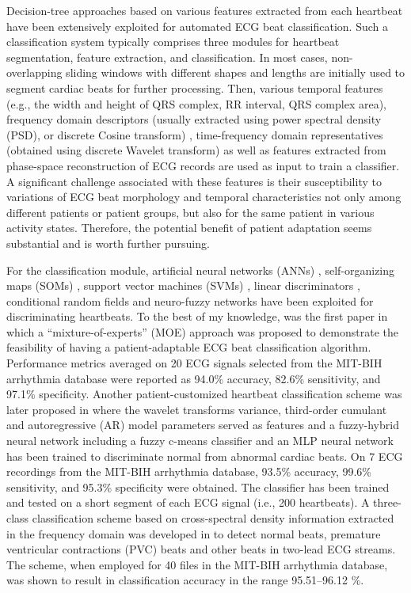 \documentclass[review]{elsarticle}
\begin{document}
Decision-tree approaches based on various features extracted from each heartbeat have been extensively exploited for automated ECG beat classification. Such a classification system typically comprises three modules for heartbeat segmentation, feature extraction, and classification. In most cases, non-overlapping sliding windows with different shapes and lengths are initially used to segment cardiac beats for further processing. Then, various temporal features (e.g., the width and height of QRS complex, RR interval, QRS complex area)\cite{de2004automatic,christov2006comparative}, frequency domain descriptors (usually extracted using power spectral density (PSD), or discrete Cosine transform) \cite{dutta2010correlation,chen2017heartbeat}, time-frequency domain representatives (obtained using discrete Wavelet transform) \cite{christov2006comparative,faezipour2010patient} as well as features extracted from phase-space reconstruction of ECG records \cite{ubeyli2010recurrent,nejadgholi2011using} are used as input to train a classifier. A significant challenge associated with these features is their susceptibility to variations of ECG beat morphology and temporal characteristics not only among different patients or patient groups, but also for the same patient in various activity states. Therefore, the potential benefit of patient adaptation seems substantial and is worth further pursuing.

For the classification module, artificial neural networks (ANNs) \cite{ince2009generic,li2017high}, self-organizing maps (SOMs) \cite{hu1997patient}, support vector machines (SVMs) \cite{dutta2010correlation,chen2017heartbeat}, linear discriminators \cite{de2004automatic,de2006patient}, conditional random fields \cite{de2012weighted} and neuro-fuzzy networks \cite{engin2004ecg} have been exploited for discriminating heartbeats. 
To the best of my knowledge, \cite{hu1997patient} was the first paper in which a ``mixture-of-experts'' (MOE) approach was proposed to demonstrate the feasibility of having a patient-adaptable ECG beat classification
algorithm. Performance metrics averaged on 20 ECG signals selected from the MIT-BIH arrhythmia database were reported as 94.0\% accuracy, 82.6\% sensitivity, and 97.1\% specificity. Another patient-customized heartbeat classification scheme was later proposed in \cite{engin2004ecg} where the wavelet transforms variance, third-order cumulant and autoregressive (AR) model parameters served as features and a fuzzy-hybrid neural network including a fuzzy c-means
classifier and an MLP neural network has been trained to discriminate normal from abnormal cardiac beats. On 7 ECG recordings from the MIT-BIH arrhythmia database, 93.5\% accuracy, 99.6\% sensitivity, and 95.3\% specificity were obtained. The classifier has been trained and tested on a short segment of each ECG signal (i.e., 200 heartbeats). 
A three-class classification scheme based on cross-spectral density information extracted in the frequency domain was developed in \cite{dutta2010correlation} to detect normal beats, premature ventricular contractions (PVC) beats and other beats in two-lead ECG streams. The scheme, when employed for 40 files in the MIT-BIH arrhythmia database, was shown to result in classification accuracy in the range 95.51--96.12 \%.
\end{document}
